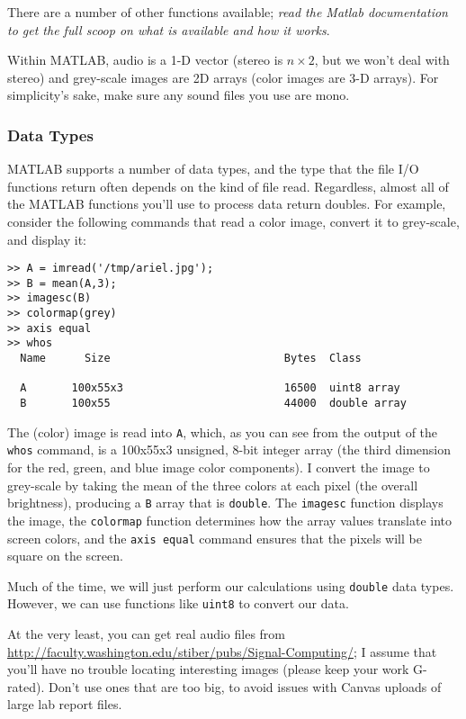 There are a number of other functions available; \emph{read the Matlab
  documentation to get the full scoop on what is available and how it
  works}.

Within MATLAB, audio is a 1-D vector (stereo is $n \times 2$, but we
won't deal with stereo) and grey-scale images are 2D arrays (color
images are 3-D arrays). For simplicity's sake, make sure any sound
files you use are mono.

\subsubsection{Data Types}

MATLAB supports a number of data types, and the type that the file I/O
functions return often depends on the kind of file read. Regardless,
almost all of the MATLAB functions you'll use to process data return
doubles. For example, consider the following commands that read a
color image, convert it to grey-scale, and display it:
\begin{lstlisting}[style=Matlab-editor,basicstyle=\mlttfamily\small]
>> A = imread('/tmp/ariel.jpg');
>> B = mean(A,3);
>> imagesc(B)
>> colormap(grey)
>> axis equal
>> whos
  Name      Size                           Bytes  Class

  A       100x55x3                         16500  uint8 array
  B       100x55                           44000  double array
\end{lstlisting}
The (color) image is read into \verb|A|, which, as you can see from
the output of the \verb|whos| command, is a 100x55x3 unsigned, 8-bit
integer array (the third dimension for the red, green, and blue image
color components). I convert the image to grey-scale by taking the
mean of the three colors at each pixel (the overall brightness),
producing a \verb|B| array that is \verb|double|. The
\verb|imagesc| function displays the image, the \verb|colormap|
function determines how the array values translate into screen colors,
and the \verb|axis equal| command ensures that the pixels will be
square on the screen.

Much of the time, we will just perform our calculations using
\verb|double| data types. However, we can use functions like
\verb|uint8| to convert our data.

At the very least, you can get real audio files from
\url{http://faculty.washington.edu/stiber/pubs/Signal-Computing/}; I assume that
you'll have no trouble locating interesting images (please keep your
work G-rated). Don't use ones that are too big, to avoid issues with
Canvas uploads of large lab report files.

